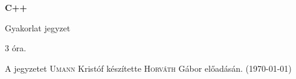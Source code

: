 \documentclass[a4paper,11.5pt]{article}
\begin{document}
	\setlength\parindent{0pt}
	\def\s{\hspace{0.2mm}\vphantom{\beta}}
	\def\Z{\mathbb{Z}}
	\def\Q{\mathbb{Q}}
	\def\R{\mathbb{R}}
	\def\C{\mathbb{C}}
	\def\N{\mathbb{N}}
	\def\Ra{\overline{\mathbb{R}}}
	
	\def\sume{\displaystyle\sum_{n=1}^{+\infty}}
	\def\sumn{\displaystyle\sum_{n=0}^{+\infty}}
	
	\def\narrow{\underset{n\rightarrow+\infty}{\longrightarrow}}
	\def\limn{\displaystyle\lim_{n\to +\infty}}
	\def\limx{\displaystyle\lim_{x\to +\infty}}
	
	\theoremstyle{definition}
	\newtheorem{theorem}{Tétel}[subsection] 
	
	\theoremstyle{definition}
	\newtheorem{definition}[theorem]{Definíció} 
	\newtheorem{example}[theorem]{Példa} 
	\newtheorem{task}[theorem]{Feladat} 
	\newtheorem{note}[theorem]{Megjegyzés}
	\begin{center}
		{\LARGE\textbf{C++}}
		
		{\Large Gyakorlat jegyzet}
		
		3 óra.
	\end{center}
	A jegyzetet \textsc{Umann} Kristóf készítette \textsc{Horváth} Gábor  előadásán. (\today)
	
\end{document}
